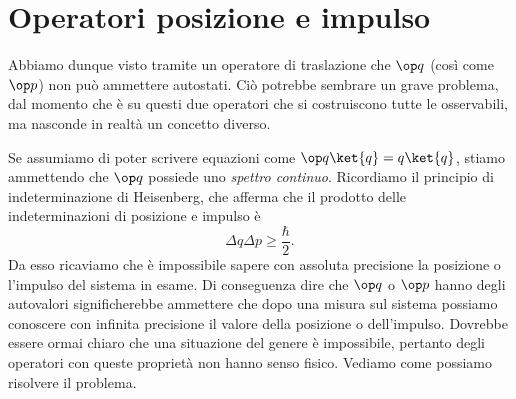 \section{Operatori posizione e impulso}
Abbiamo dunque visto tramite un operatore di traslazione che $\op q$ (cos\`i come $\op p$) non può ammettere autostati.
Ciò potrebbe sembrare un grave problema, dal momento che è su questi due operatori che si costruiscono tutte le osservabili, ma nasconde in realtà un concetto diverso.

Se assumiamo di poter scrivere equazioni come $\op q\ket{q}=q\ket{q}$, stiamo ammettendo che $\op q$ possiede uno \emph{spettro continuo}.
Ricordiamo il principio di indeterminazione di Heisenberg, che afferma che il prodotto delle indeterminazioni di posizione e impulso è
\begin{equation}
	\Delta q\Delta p\geq\frac{\hbar}2.
\end{equation}
Da esso ricaviamo che è impossibile sapere con assoluta precisione la posizione o l'impulso del sistema in esame.
Di conseguenza dire che $\op q$ o $\op p$ hanno degli autovalori significherebbe ammettere che dopo una misura sul sistema possiamo conoscere con infinita precisione il valore della posizione o dell'impulso.
Dovrebbe essere ormai chiaro che una situazione del genere è impossibile, pertanto degli operatori con queste proprietà non hanno senso fisico.
Vediamo come possiamo risolvere il problema.

